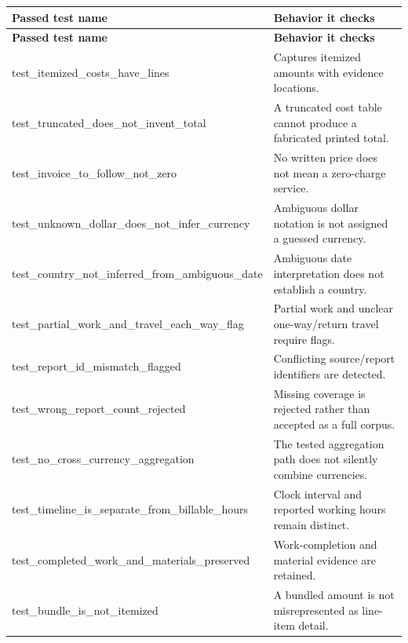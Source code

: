 \documentclass[11pt,a4paper]{article}
\begin{document}
\begin{longtable}{@{}L{68mm}L{77mm}@{}}
\toprule
\textbf{Passed test name} & \textbf{Behavior it checks}\\
\midrule\endfirsthead
\toprule
\textbf{Passed test name} & \textbf{Behavior it checks}\\
\midrule\endhead
{\ttfamily\footnotesize test\_\allowbreak{}itemized\_\allowbreak{}costs\_\allowbreak{}have\_\allowbreak{}lines} & Captures itemized amounts with evidence locations.\\
{\ttfamily\footnotesize test\_\allowbreak{}truncated\_\allowbreak{}does\_\allowbreak{}not\_\allowbreak{}invent\_\allowbreak{}total} & A truncated cost table cannot produce a fabricated printed total.\\
{\ttfamily\footnotesize test\_\allowbreak{}invoice\_\allowbreak{}to\_\allowbreak{}follow\_\allowbreak{}not\_\allowbreak{}zero} & No written price does not mean a zero-charge service.\\
{\ttfamily\footnotesize test\_\allowbreak{}unknown\_\allowbreak{}dollar\_\allowbreak{}does\_\allowbreak{}not\_\allowbreak{}infer\_\allowbreak{}currency} & Ambiguous dollar notation is not assigned a guessed currency.\\
{\ttfamily\footnotesize test\_\allowbreak{}country\_\allowbreak{}not\_\allowbreak{}inferred\_\allowbreak{}from\_\allowbreak{}ambiguous\_\allowbreak{}date} & Ambiguous date interpretation does not establish a country.\\
{\ttfamily\footnotesize test\_\allowbreak{}partial\_\allowbreak{}work\_\allowbreak{}and\_\allowbreak{}travel\_\allowbreak{}each\_\allowbreak{}way\_\allowbreak{}flag} & Partial work and unclear one-way/return travel require flags.\\
{\ttfamily\footnotesize test\_\allowbreak{}report\_\allowbreak{}id\_\allowbreak{}mismatch\_\allowbreak{}flagged} & Conflicting source/report identifiers are detected.\\
{\ttfamily\footnotesize test\_\allowbreak{}wrong\_\allowbreak{}report\_\allowbreak{}count\_\allowbreak{}rejected} & Missing coverage is rejected rather than accepted as a full corpus.\\
{\ttfamily\footnotesize test\_\allowbreak{}no\_\allowbreak{}cross\_\allowbreak{}currency\_\allowbreak{}aggregation} & The tested aggregation path does not silently combine currencies.\\
{\ttfamily\footnotesize test\_\allowbreak{}timeline\_\allowbreak{}is\_\allowbreak{}separate\_\allowbreak{}from\_\allowbreak{}billable\_\allowbreak{}hours} & Clock interval and reported working hours remain distinct.\\
{\ttfamily\footnotesize test\_\allowbreak{}completed\_\allowbreak{}work\_\allowbreak{}and\_\allowbreak{}materials\_\allowbreak{}preserved} & Work-completion and material evidence are retained.\\
{\ttfamily\footnotesize test\_\allowbreak{}bundle\_\allowbreak{}is\_\allowbreak{}not\_\allowbreak{}itemized} & A bundled amount is not misrepresented as line-item detail.\\
\bottomrule
\end{longtable}
\end{document}
